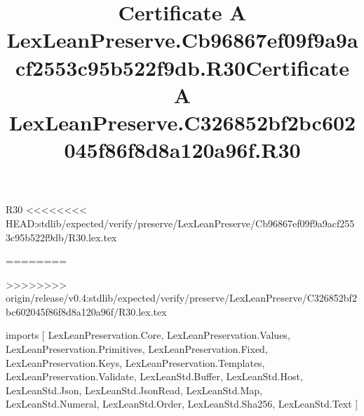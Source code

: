 \begin{lexlean}{R30}
<<<<<<<< HEAD:stdlib/expected/verify/preserve/LexLeanPreserve/Cb96867ef09f9a9acf2553c95b522f9db/R30.lex.tex
\title{Certificate A LexLeanPreserve.Cb96867ef09f9a9acf2553c95b522f9db.R30}
========
\title{Certificate A LexLeanPreserve.C326852bf2bc602045f86f8d8a120a96f.R30}
>>>>>>>> origin/release/v0.4:stdlib/expected/verify/preserve/LexLeanPreserve/C326852bf2bc602045f86f8d8a120a96f/R30.lex.tex
\begin{coremodule}
imports [
  LexLeanPreservation.Core,
  LexLeanPreservation.Values,
  LexLeanPreservation.Primitives,
  LexLeanPreservation.Fixed,
  LexLeanPreservation.Keys,
  LexLeanPreservation.Templates,
  LexLeanPreservation.Validate,
  LexLeanStd.Buffer,
  LexLeanStd.Host,
  LexLeanStd.Json,
  LexLeanStd.JsonRead,
  LexLeanStd.Map,
  LexLeanStd.Numeral,
  LexLeanStd.Order,
  LexLeanStd.Sha256,
  LexLeanStd.Text
]


\end{coremodule}
\end{lexlean}
